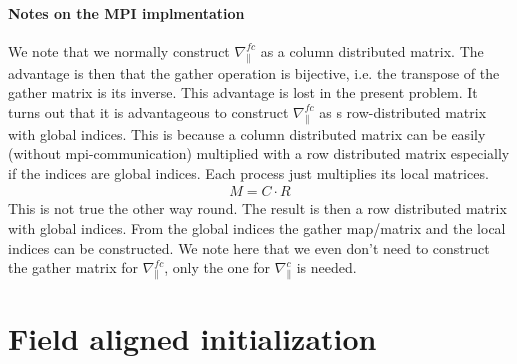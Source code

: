 \paragraph{Notes on the MPI implmentation}
We note that we normally construct $\nabla_\parallel^{fc}$ as a column 
distributed
matrix. The advantage is then that the gather operation is bijective, i.e. the transpose of the gather matrix is its inverse. 
This advantage is lost in the present problem. 
It turns out that it is advantageous to construct $\nabla_\parallel^{fc}$
as s row-distributed matrix with global indices. 
This is because a column distributed matrix can be easily (without mpi-communication) multiplied
with a row distributed matrix especially if the indices are global indices. 
Each process just multiplies its local matrices.
\begin{align}
M = C\cdot R
\end{align}
This is not true the other way round. 
The result is then a row distributed matrix with global indices. 
From the global indices the gather map/matrix and the local
indices can be constructed.
We note here that we even don't need to construct the gather matrix
for $\nabla_\parallel^{fc}$, only the one for $\nabla_\parallel^c$ is
needed.
\section{Field aligned initialization} \label{sec:parallelc}

